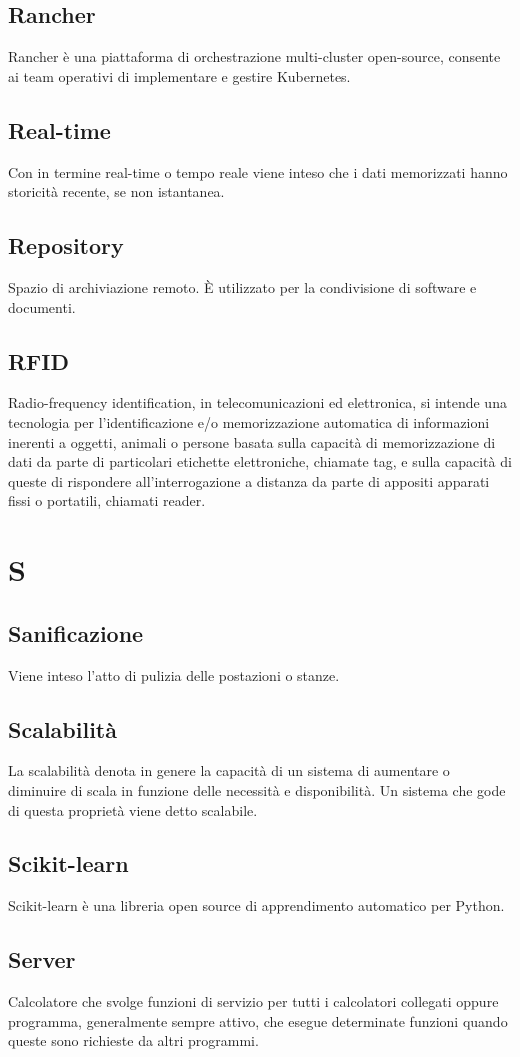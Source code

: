 \subsection{Rancher} Rancher è una piattaforma di orchestrazione multi-cluster open-source, consente ai team operativi di implementare e gestire Kubernetes.
\subsection{Real-time} Con in termine real-time o tempo reale viene inteso che i dati memorizzati hanno storicità recente, se non istantanea.
\subsection{Repository} Spazio di archiviazione remoto. È utilizzato per la condivisione di software e documenti.
\subsection{RFID} Radio-frequency identification, in telecomunicazioni ed elettronica, si intende una tecnologia per l'identificazione e/o memorizzazione automatica di informazioni inerenti a oggetti, animali o persone basata sulla capacità di memorizzazione di dati da parte di particolari etichette elettroniche, chiamate tag, e sulla capacità di queste di rispondere all'interrogazione a distanza da parte di appositi apparati fissi o portatili, chiamati reader.
\newpage \section{S}
\subsection{Sanificazione} Viene inteso l'atto di pulizia delle postazioni o stanze.
\subsection{Scalabilità} La scalabilità denota in genere la capacità di un sistema di aumentare o diminuire di scala in funzione delle necessità e disponibilità. Un sistema che gode di questa proprietà viene detto scalabile.
\subsection{Scikit-learn} Scikit-learn è una libreria open source di apprendimento automatico per Python.
\subsection{Server} Calcolatore che svolge funzioni di servizio per tutti i calcolatori collegati oppure programma, generalmente sempre attivo, che esegue determinate funzioni quando queste sono richieste da altri programmi.
